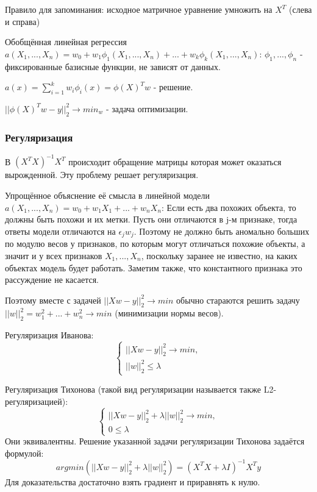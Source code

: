 Правило для запоминания: исходное матричное уравнение умножить на $X^T$ (слева и справа)

Обобщённая линейная регрессия $a(X_1, ..., X_n) = w_0 + w_1\phi_1(X_1, ..., X_n) + ... + w_k\phi_k(X_1, ..., X_n)$:
$\phi_1, ..., \phi_n$ - фиксированные базисные функции, не зависят от данных.

$a(x) = \sum\limits_{i=1}^k w_i\phi_i(x) = \phi(X)^Tw$ - решение.

$||\phi(X)^Tw - y||_2^2 \rightarrow min_w$ - задача оптимизации.

\subsubsection{Регуляризация}
В $(X^TX)^{-1}X^T$ происходит обращение матрицы которая может оказаться вырожденной. Эту проблему решает регуляризация.

Упрощённое объяснение её смысла в линейной модели
$a(X_1, ..., X_n) = w_0 + w_1X_1 + ... + w_nX_n$:
Если есть два похожих объекта, то должны быть похожи и их
метки. Пусть они отличаются в j-м признаке, тогда ответы модели отличаются
на $\epsilon_jw_j$. Поэтому не должно быть аномально больших по модулю весов
у признаков, по которым могут отличаться похожие объекты, а значит и у всех
признаков $X_1, ..., X_n$, поскольку заранее не известно, на каких объектах модель
будет работать. Заметим также, что константного признака это рассуждение не
касается.


Поэтому вместе с задачей
$|| Xw - y ||_2^2 \rightarrow min$
обычно стараются решить задачу
$|| w ||_2^2 = w_1^2 + ... + w_n^2 \rightarrow min$
(минимизации нормы весов).

Регуляризация Иванова:
\begin{equation*}
 \begin{cases}
   || Xw - y ||_2^2 \rightarrow min,
   \\
   || w ||_2^2 \leq \lambda
 \end{cases}
\end{equation*}

Регуляризация Тихонова (такой вид регуляризации называется также L2-регуляризацией):
\begin{equation*}
 \begin{cases}
   || Xw - y ||_2^2 + \lambda|| w ||_2^2 \rightarrow min,
   \\
   0 \leq \lambda
\end{cases}
\end{equation*}
Они эквивалентны. Решение указанной задачи регуляризации Тихонова задаётся формулой:
\begin{equation}\label{ss}
argmin(|| Xw - y ||_2^2 + \lambda|| w ||_2^2) = (X^TX + \lambda I)^{-1}X^Ty
\end{equation}
Для доказательства достаточно взять градиент и приравнять к нулю.

